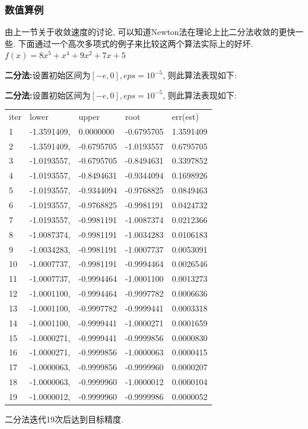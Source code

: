 \documentclass{beamer}
\begin{document}
\begin{frame}
    \frametitle{数值算例}
    由上一节关于收敛速度的讨论, 可以知道Newton法在理论上比二分法收敛的更快一些. 下面通过一个高次多项式的例子来比较这两个算法实际上的好坏.
    $f(x) = 8x^5 + x^4 + 9x^2 + 7x + 5$
    \par \textbf{二分法:}设置初始区间为$[-e, 0], eps = 10^{-5}$, 则此算法表现如下:
\end{frame}

\begin{frame}
    \par \textbf{二分法:}设置初始区间为$[-e, 0], eps = 10^{-5}$, 则此算法表现如下:
\begin{table}[h]
    \small \scriptsize
    \begin{tabular}{lllll}
    iter & lower       & upper      & root       & err(est)  \\
    1    & -1.3591409, & 0.0000000  & -0.6795705 & 1.3591409 \\
    2    & -1.3591409, & -0.6795705 & -1.0193557 & 0.6795705 \\
    3    & -1.0193557, & -0.6795705 & -0.8494631 & 0.3397852 \\
    4    & -1.0193557, & -0.8494631 & -0.9344094 & 0.1698926 \\
    5    & -1.0193557, & -0.9344094 & -0.9768825 & 0.0849463 \\
    6    & -1.0193557, & -0.9768825 & -0.9981191 & 0.0424732 \\
    7    & -1.0193557, & -0.9981191 & -1.0087374 & 0.0212366 \\
    8    & -1.0087374, & -0.9981191 & -1.0034283 & 0.0106183 \\
    9    & -1.0034283, & -0.9981191 & -1.0007737 & 0.0053091 \\
    10   & -1.0007737, & -0.9981191 & -0.9994464 & 0.0026546 \\
    11   & -1.0007737, & -0.9994464 & -1.0001100 & 0.0013273 \\
    12   & -1.0001100, & -0.9994464 & -0.9997782 & 0.0006636 \\
    13   & -1.0001100, & -0.9997782 & -0.9999441 & 0.0003318 \\
    14   & -1.0001100, & -0.9999441 & -1.0000271 & 0.0001659 \\
    15   & -1.0000271, & -0.9999441 & -0.9999856 & 0.0000830 \\
    16   & -1.0000271, & -0.9999856 & -1.0000063 & 0.0000415 \\
    17   & -1.0000063, & -0.9999856 & -0.9999960 & 0.0000207 \\
    18   & -1.0000063, & -0.9999960 & -1.0000012 & 0.0000104 \\
    19   & -1.0000012, & -0.9999960 & -0.9999986 & 0.0000052
    \end{tabular}
    \end{table}

\par 二分法迭代19次后达到目标精度. \\
\end{frame}
\end{document}
